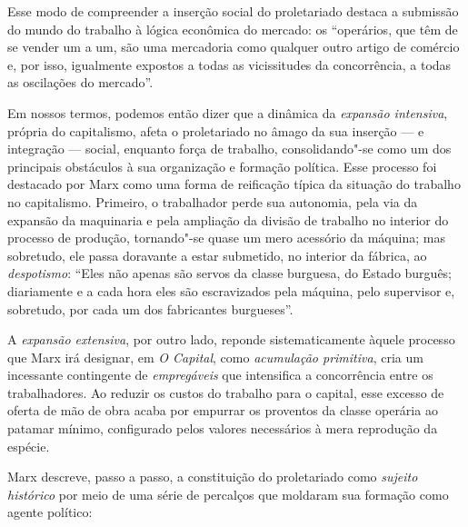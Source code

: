 Esse modo de compreender a inserção social do proletariado destaca a
submissão do mundo do trabalho à lógica econômica do mercado: os
``operários, que têm de se vender um a um, são uma mercadoria como
qualquer outro artigo de comércio e, por isso, igualmente expostos a
todas as vicissitudes da concorrência, a todas as oscilações do
mercado''.

Em nossos termos, podemos então dizer que a dinâmica da \textit{expansão
intensiva}, própria do capitalismo, afeta o proletariado no âmago da sua
inserção --- e integração --- social, enquanto força de trabalho,
consolidando"-se como um dos principais obstáculos à sua organização e
formação política. Esse processo foi destacado por Marx como uma forma
de reificação típica da situação do trabalho no capitalismo. Primeiro,
o trabalhador perde sua autonomia, pela via da expansão da maquinaria e
pela ampliação da divisão de trabalho no interior do processo de
produção, tornando"-se quase um mero acessório da máquina; mas
sobretudo, ele passa doravante a estar submetido, no interior da
fábrica, ao \textit{despotismo}: ``Eles não apenas são servos da classe
burguesa, do Estado burguês; diariamente e a cada hora eles são
escravizados pela máquina, pelo supervisor e, sobretudo, por cada um
dos fabricantes burgueses''.

A \textit{expansão extensiva}, por outro lado, reponde sistematicamente àquele
processo que Marx irá designar, em \textit{O Capital}, como \textit{acumulação
primitiva}, cria um incessante contingente de \textit{empregáveis} que
intensifica a concorrência entre os trabalhadores. Ao reduzir os custos
do trabalho para o capital, esse excesso de oferta de mão de obra
acaba por empurrar os proventos da classe operária ao patamar mínimo,
configurado pelos valores necessários à mera reprodução da espécie.


Marx descreve, passo a passo, a constituição do proletariado como
\textit{sujeito histórico} por meio de uma série de percalços que moldaram sua
formação como agente político: 

